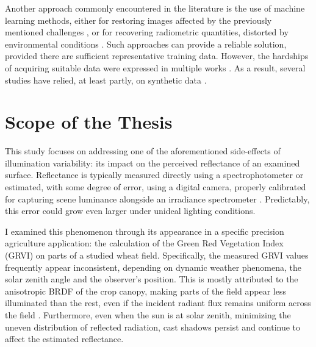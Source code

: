 Another approach commonly encountered in the literature is the use of machine learning methods, either for restoring images affected by the previously mentioned challenges \cite{dl_low_light, dl-img-rest, macgan}, or for recovering radiometric quantities, distorted by environmental conditions \cite{illum-correction, rfg-change-detect}. Such approaches can provide a reliable solution, provided there are sufficient representative training data. However, the hardships of acquiring suitable data were expressed in multiple works \cite{dl-img-rest, rfg-change-detect}. As a result, several studies have relied, at least partly, on synthetic data \cite{dl-img-rest, macgan}.

\section{Scope of the Thesis}

This study focuses on addressing one of the aforementioned side-effects of illumination variability: its impact on the perceived reflectance of an examined surface. Reflectance is typically measured directly using a spectrophotometer or estimated, with some degree of error, using a digital camera, properly calibrated for capturing scene luminance \cite{luminance-cal-camera, rp-luminance-cmaera} alongside an irradiance spectrometer \cite{drones-reflectance}. Predictably, this error could grow even larger under unideal lighting conditions.

I examined this phenomenon through its appearance in a specific precision agriculture application: the calculation of the Green Red Vegetation Index (GRVI) on parts of a studied wheat field.  Specifically, the measured GRVI values frequently appear inconsistent, depending on dynamic weather phenomena, the solar zenith angle and the observer's position. This is mostly attributed to the anisotropic BRDF of the crop canopy, making parts of the field appear less illuminated than the rest, even if the incident radiant flux remains uniform across the field \cite{impact_of_sunlight_conditions, brdf}. Furthermore, even when the sun is at solar zenith, minimizing the uneven distribution of reflected radiation, cast shadows persist and continue to affect the estimated reflectance. 

